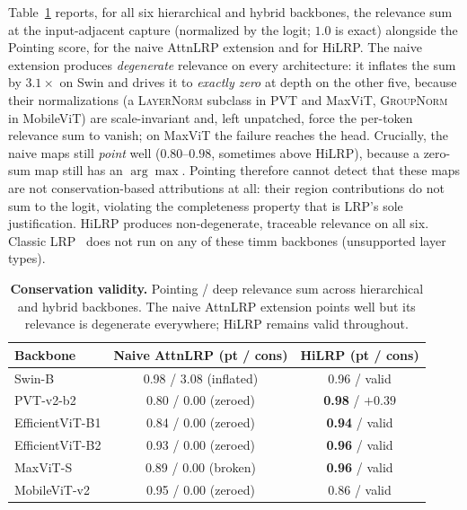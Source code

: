 \documentclass[lettersize,journal]{IEEEtran}
\begin{document}
Table~\ref{tab:conservation} reports, for all six hierarchical and hybrid backbones, the relevance sum at the input-adjacent capture (normalized by the logit; $1.0$ is exact) alongside the Pointing score, for the naive AttnLRP extension and for HiLRP. The naive extension produces \emph{degenerate} relevance on every architecture: it inflates the sum by $3.1\times$ on Swin and drives it to \emph{exactly zero} at depth on the other five, because their normalizations (a \textsc{LayerNorm} subclass in PVT and MaxViT, \textsc{GroupNorm} in MobileViT) are scale-invariant and, left unpatched, force the per-token relevance sum to vanish; on MaxViT the failure reaches the head. Crucially, the naive maps still \emph{point} well ($0.80$--$0.98$, sometimes above HiLRP), because a zero-sum map still has an $\arg\max$. Pointing therefore cannot detect that these maps are not conservation-based attributions at all: their region contributions do not sum to the logit, violating the completeness property that is LRP's sole justification. HiLRP produces non-degenerate, traceable relevance on all six. Classic LRP~\cite{bach2015lrp} does not run on any of these timm backbones (unsupported layer types).

\begin{table}[h]
  \centering
  \caption{\textbf{Conservation validity.} Pointing / deep relevance sum across hierarchical and hybrid backbones. The naive AttnLRP extension points well but its relevance is degenerate everywhere; HiLRP remains valid throughout.}
  \label{tab:conservation}
  \setlength{\tabcolsep}{4pt}
  \begin{tabular}{l cc}
    \toprule
    Backbone & Naive AttnLRP (pt / cons) & \textbf{HiLRP} (pt / cons) \\
    \midrule
    Swin-B          & 0.98 / $3.08$ (inflated) & 0.96 / valid \\
    PVT-v2-b2       & 0.80 / $0.00$ (zeroed)   & \textbf{0.98} / $+0.39$ \\
    EfficientViT-B1 & 0.84 / $0.00$ (zeroed)   & \textbf{0.94} / valid \\
    EfficientViT-B2 & 0.93 / $0.00$ (zeroed)   & \textbf{0.96} / valid \\
    MaxViT-S        & 0.89 / $0.00$ (broken)   & \textbf{0.96} / valid \\
    MobileViT-v2    & 0.95 / $0.00$ (zeroed)   & 0.86 / valid \\
    \bottomrule
  \end{tabular}
\end{table}
\end{document}
